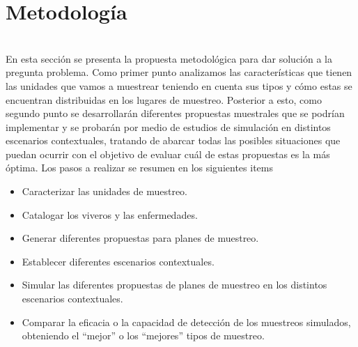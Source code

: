 \chapter{Metodolog\'{i}a}
~\\En esta secci\'{o}n se presenta la propuesta metodol\'{o}gica para dar soluci\'{o}n a la pregunta problema. Como primer punto analizamos las caracter\'{i}sticas que tienen las unidades que vamos a muestrear teniendo en cuenta sus tipos y c\'{o}mo estas se encuentran distribuidas en los lugares de muestreo. Posterior a esto, como segundo punto se desarrollar\'{a}n diferentes propuestas muestrales que se podr\'{i}an implementar y se probar\'{a}n por medio de estudios de simulaci\'{o}n en distintos escenarios contextuales, tratando de abarcar todas las posibles situaciones que puedan ocurrir con el objetivo de evaluar cu\'{a}l de estas propuestas es la m\'{a}s \'{o}ptima. Los pasos a realizar se resumen en los siguientes items

\begin{itemize}
\item Caracterizar las unidades de muestreo.
\item Catalogar los viveros y las enfermedades.
\item Generar diferentes propuestas para planes de muestreo.
\item Establecer diferentes escenarios contextuales.
\item Simular las diferentes propuestas de planes de muestreo en los distintos escenarios contextuales.
\item Comparar la eficacia o la capacidad de detecci\'{o}n de los muestreos simulados, obteniendo el ``mejor'' o los ``mejores'' tipos de muestreo. 
\end{itemize}